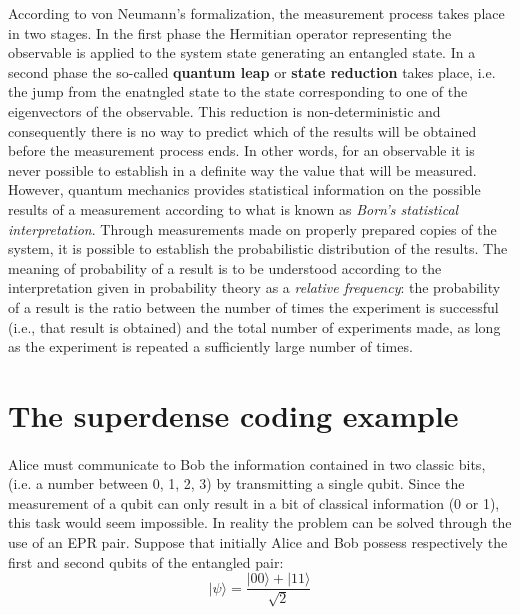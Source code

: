 \documentclass[a4paper,10pt]{article}
\begin{document}
According to von Neumann's formalization, the measurement process takes place in two stages. In the first phase the Hermitian operator representing the observable is applied to the system state generating an entangled state. In a second phase the so-called \textbf{quantum leap} or \textbf{state reduction} takes place, i.e. the jump from the enatngled state to the state corresponding to one of the eigenvectors of the observable. This reduction is non-deterministic and consequently there is no way to predict which of the results will be obtained before the measurement process ends. In other words, for an observable it is never possible to establish in a definite way the value that will be measured. However, quantum mechanics provides statistical information on the possible results of a measurement according to what is known as \textit{Born's statistical interpretation}. Through measurements made on properly prepared copies of the system, it is possible to establish the probabilistic distribution of the results. The meaning of probability of a result is to be understood according to the interpretation given in probability theory as a \textit{relative frequency}: the probability of a result is the ratio between the number of times the experiment is successful (i.e., that result is obtained) and the total number of experiments made, as long as the experiment is repeated a sufficiently large number of times.

\section{The superdense coding example}

\paragraph{} Alice must communicate to Bob the information contained in two classic bits, (i.e. a number between 0, 1, 2, 3) by transmitting a single qubit. Since the measurement of a qubit can only result in a bit of classical information (0 or 1), this task would seem impossible. In reality the problem can be solved through the use of an EPR pair. Suppose that initially Alice and Bob possess respectively the first and second qubits of the entangled pair:
$$|\psi\rangle = \frac{|00\rangle + |11\rangle}{\sqrt{2}}$$
\end{document}
